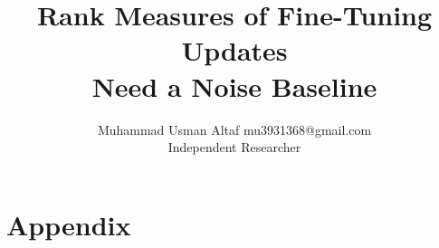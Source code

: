 \documentclass[10pt]{article} %
\title{Rank Measures of Fine-Tuning Updates\\Need a Noise Baseline}
\author{\name Muhammad Usman Altaf \email mu3931368@gmail.com \\
      \addr Independent Researcher}
\begin{document}
\maketitle













\appendix
\section*{Appendix}

\end{document}
